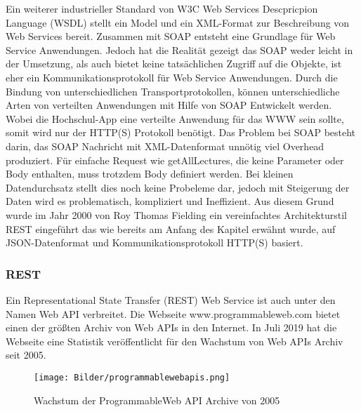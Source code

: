 Ein weiterer industrieller Standard von W3C Web Services Descpricpion Language (WSDL) stellt ein Model und ein XML-Format zur Beschreibung von Web Services bereit. Zusammen mit SOAP entsteht eine Grundlage für Web Service Anwendungen.
Jedoch hat die Realität gezeigt das SOAP weder leicht in der Umsetzung, als auch bietet keine tatsächlichen Zugriff auf die Objekte, ist eher ein Kommunikationsprotokoll für Web Service Anwendungen. Durch die Bindung von unterschiedlichen Transportprotokollen, können unterschiedliche Arten von verteilten Anwendungen mit Hilfe von SOAP Entwickelt werden. Wobei die Hochschul-App eine verteilte Anwendung für das WWW sein sollte, somit wird nur der HTTP(S) Protokoll benötigt. Das Problem bei SOAP besteht darin, das SOAP Nachricht mit XML-Datenformat unnötig viel Overhead produziert. Für einfache Request wie getAllLectures, die keine Parameter oder Body enthalten, muss trotzdem Body definiert werden. Bei kleinen Datendurchsatz stellt dies noch keine Probeleme dar, jedoch mit Steigerung der Daten wird es problematisch, kompliziert und Ineffizient. 
Aus diesem Grund wurde im Jahr 2000 von Roy Thomas Fielding ein vereinfachtes Architekturstil REST eingeführt das wie bereits am Anfang des Kapitel erwähnt wurde, auf JSON-Datenformat und Kommunikationsprotokoll HTTP(S) basiert.


\subsubsection{REST}

Ein Representational State Transfer (REST) Web Service ist auch unter den Namen Web API verbreitet. Die Webseite www.programmableweb.com bietet einen der größten Archiv von Web APIs in den Internet. In Juli 2019 hat die Webseite eine Statistik veröffentlicht für den Wachstum von Web APIs Archiv seit 2005.
\begin{figure}[H]
\centering
\texttt{[image: Bilder/programmablewebapis.png]}
\caption{Wachstum der ProgrammableWeb API Archive von 2005\label{fig:api_statistic}}
\end{figure}

